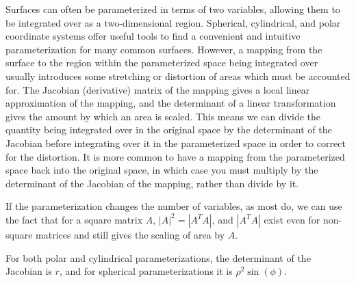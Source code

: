 Surfaces can often be parameterized in terms of two variables, allowing them to be integrated over as a two-dimensional region. Spherical, cylindrical, and polar coordinate systems offer useful tools to find a convenient and intuitive parameterization for many common surfaces. However, a mapping from the surface to the region within the parameterized space being integrated over usually introduces some stretching or distortion of areas which must be accounted for. The Jacobian (derivative) matrix of the mapping gives a local linear approximation of the mapping, and the determinant of a linear transformation gives the amount by which an area is scaled. This means we can divide the quantity being integrated over in the original space by the determinant of the Jacobian before integrating over it in the parameterized space in order to correct for the distortion. It is more common to have a mapping from the parameterized space back into the original space, in which case you must multiply by the determinant of the Jacobian of the mapping, rather than divide by it.

If the parameterization changes the number of variables, as most do, we can use the fact that for a square matrix $A$, $|A|^2 = |A^TA|$, and $|A^TA|$ exist even for non-square matrices and still gives the scaling of area by $A$.

For both polar and cylindrical parameterizations, the determinant of the Jacobian is $r$, and for spherical parameterizations it is $\rho^2\sin(\phi)$.
